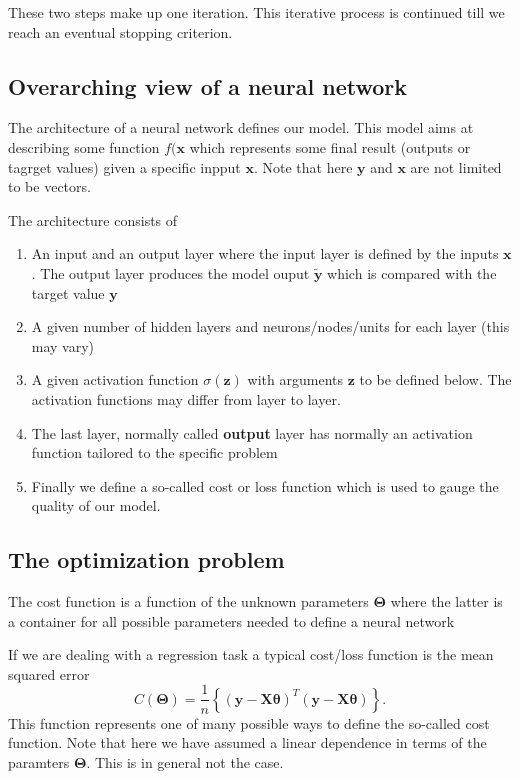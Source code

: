 \documentclass[%
oneside,                 %
final,                   %
10pt]{article}
\begin{document}
\noindent
These two steps make up one iteration. This iterative process is continued till we reach an eventual stopping criterion.

\subsection{Overarching view of a neural network}

The architecture of a neural network defines our model. This model
aims at describing some function $f(\bm{x}$ which represents
some final result (outputs or tagrget values) given a specific inpput
$\bm{x}$. Note that here $\bm{y}$ and $\bm{x}$ are not limited to be
vectors.

The architecture consists of
\begin{enumerate}
\item An input and an output layer where the input layer is defined by the inputs $\bm{x}$. The output layer produces the model ouput $\bm{\tilde{y}}$ which is compared with the target value $\bm{y}$

\item A given number of hidden layers and neurons/nodes/units for each layer (this may vary)

\item A given activation function $\sigma(\bm{z})$ with arguments $\bm{z}$ to be defined below. The activation functions may differ from layer to layer.

\item The last layer, normally called \textbf{output} layer has normally an activation function tailored to the specific problem

\item Finally we define a so-called cost or loss function which is used to gauge the quality of our model. 
\end{enumerate}

\noindent
\subsection{The optimization problem}

The cost function is a function of the unknown parameters
$\bm{\Theta}$ where the latter is a container for all possible
parameters needed to define a neural network

If we are dealing with a regression task a typical cost/loss function
is the mean squared error
\[
C(\bm{\Theta})=\frac{1}{n}\left\{\left(\bm{y}-\bm{X}\bm{\theta}\right)^T\left(\bm{y}-\bm{X}\bm{\theta}\right)\right\}.
\]
This function represents one of many possible ways to define
the so-called cost function. Note that here we have assumed a linear dependence in terms of the paramters $\bm{\Theta}$. This is in general not the case.
\end{document}
